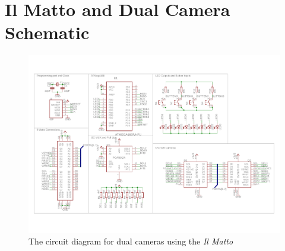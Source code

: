 \section{Il Matto and Dual Camera Schematic}\label{sch:IlMatto:Cameras}
\begin{figure}
\centering
\includegraphics[width=\textheight-4cm,height=\textwidth,keepaspectratio]{Figures/IlMattoCamera_CircuitDiagram.pdf} 
\caption{The circuit diagram for dual cameras using the \textit{Il Matto}}
\label{sch:DualCam_Schematic}
\end{figure}
\clearpage

